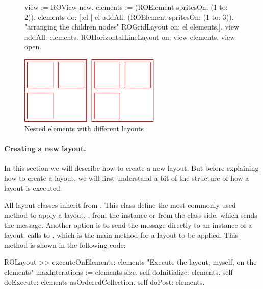 \documentclass[a4paper,10pt,twoside]{book}
\begin{document}
\begin{figure}[H]
      \begin{minipage}[t]{0.61\textwidth}
      \vspace{0pt}
     \begin{code}{}
view := ROView new.
elements := (ROElement spritesOn: (1 to: 2)).
elements 
	do: [:el | el addAll: (ROElement spritesOn: (1 to: 3)). 
	           "arranging the children nodes"
			   ROGridLayout on: el elements.].			   
view addAll: elements.
ROHorizontalLineLayout on: view elements.
view open.
  \end{code}
   \end{minipage}
   \hfill
   \begin{minipage}[t]{0.5\textwidth}
      \vspace{0pt}\raggedright
       \centering
		\includegraphics[width=0.6\textwidth]{nestedLayout}
   \end{minipage}
\label{fig:nestedLayout}
\caption{Nested elements with different layouts }
\end{figure} 


\paragraph{Creating a new layout.}
In this section we will describe how to create a new layout. But before explaining how to create a layout, we will first understand a bit of the structure of how a layout is executed. 

All layout classes inherit from . 
This class define the most commonly used method to apply a layout, , from the instance or from the class side, which sends the  message. Another option is to send the  message directly to an instance of a layout. 
 calls to , which is the main method for a layout to be applied. This method is shown in the following code:

\begin{code}{}
ROLayout >> executeOnElements: elements 
	"Execute the layout, myself, on the elements"	
	maxInterations := elements size.
	self doInitialize: elements.
	self doExecute: elements asOrderedCollection.
	self doPost: elements.
\end{code}
\end{document}
